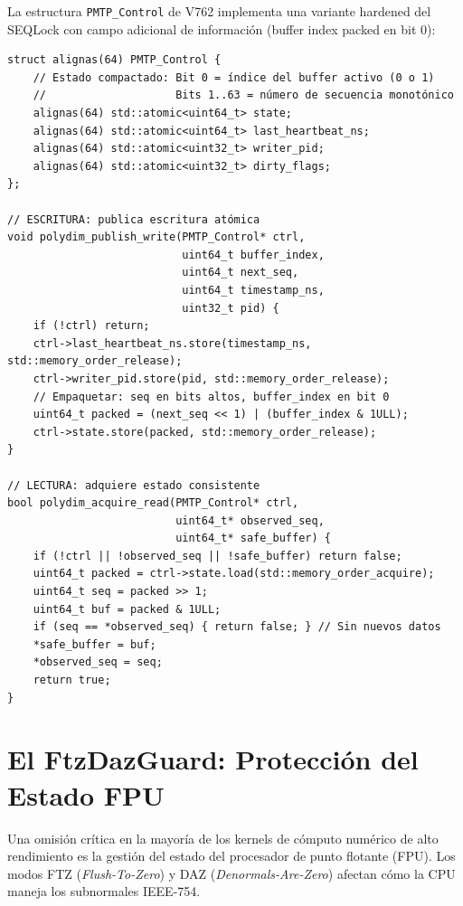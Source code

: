 La estructura \texttt{PMTP\_Control} de V762 implementa una variante hardened del SEQLock
con campo adicional de información (buffer index packed en bit 0):

\begin{lstlisting}[style=cppstyle, caption={PMTP\_Control SEQLock hardened --- kernel\_cpp\_v762.cpp}, label=lst:pmtp_control]
struct alignas(64) PMTP_Control {
    // Estado compactado: Bit 0 = índice del buffer activo (0 o 1)
    //                    Bits 1..63 = número de secuencia monotónico
    alignas(64) std::atomic<uint64_t> state;
    alignas(64) std::atomic<uint64_t> last_heartbeat_ns;
    alignas(64) std::atomic<uint32_t> writer_pid;
    alignas(64) std::atomic<uint32_t> dirty_flags;
};

// ESCRITURA: publica escritura atómica
void polydim_publish_write(PMTP_Control* ctrl,
                           uint64_t buffer_index,
                           uint64_t next_seq,
                           uint64_t timestamp_ns,
                           uint32_t pid) {
    if (!ctrl) return;
    ctrl->last_heartbeat_ns.store(timestamp_ns, std::memory_order_release);
    ctrl->writer_pid.store(pid, std::memory_order_release);
    // Empaquetar: seq en bits altos, buffer_index en bit 0
    uint64_t packed = (next_seq << 1) | (buffer_index & 1ULL);
    ctrl->state.store(packed, std::memory_order_release);
}

// LECTURA: adquiere estado consistente
bool polydim_acquire_read(PMTP_Control* ctrl,
                          uint64_t* observed_seq,
                          uint64_t* safe_buffer) {
    if (!ctrl || !observed_seq || !safe_buffer) return false;
    uint64_t packed = ctrl->state.load(std::memory_order_acquire);
    uint64_t seq = packed >> 1;
    uint64_t buf = packed & 1ULL;
    if (seq == *observed_seq) { return false; } // Sin nuevos datos
    *safe_buffer = buf;
    *observed_seq = seq;
    return true;
}
\end{lstlisting}

\section{El FtzDazGuard: Protección del Estado FPU}

Una omisión crítica en la mayoría de los kernels de cómputo numérico de alto rendimiento
es la gestión del estado del procesador de punto flotante (FPU). Los modos FTZ
(\textit{Flush-To-Zero}) y DAZ (\textit{Denormals-Are-Zero}) afectan cómo la CPU
maneja los subnormales IEEE-754.

